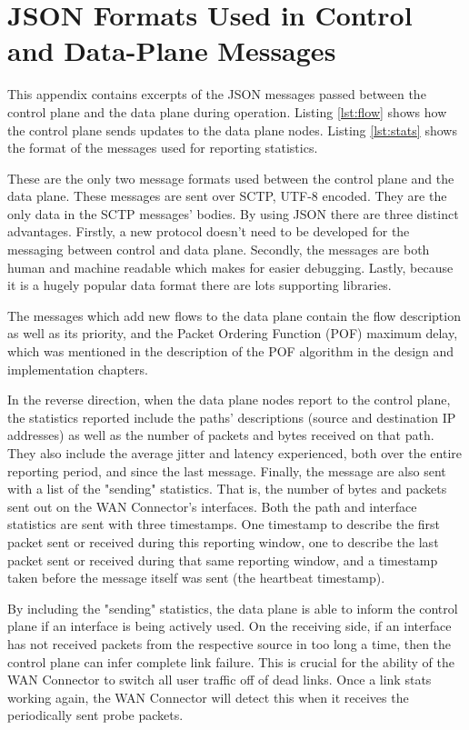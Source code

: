 

\cleardoublepage
\chapter{JSON Formats Used in Control and Data-Plane Messages}
\label{appendix:format}

This appendix contains excerpts of the JSON messages passed between the control plane and the data plane during operation. Listing \ref{lst:flow} shows how the control plane sends updates to the data plane nodes. Listing \ref{lst:stats} shows the format of the messages used for reporting statistics.

These are the only two message formats used between the control plane and the data plane. These messages are sent over SCTP, UTF-8 encoded. They are the only data in the SCTP messages' bodies. By using JSON there are three distinct advantages. Firstly, a new protocol doesn't need to be developed for the messaging between control and data plane. Secondly, the messages are both human and machine readable which makes for easier debugging. Lastly, because it is a hugely popular data format there are lots supporting libraries. 

The messages which add new flows to the data plane contain the flow description as well as its priority, and the Packet Ordering Function (POF) maximum delay, which was mentioned in the description of the POF algorithm in the design and implementation chapters.

In the reverse direction, when the data plane nodes report to the control plane, the statistics reported include the paths' descriptions (source and destination IP addresses) as well as the number of packets and bytes received on that path. They also include the average jitter and latency experienced, both over the entire reporting period, and since the last message. Finally, the message are also sent with a list of the "sending" statistics. That is, the number of bytes and packets sent out on the WAN Connector's interfaces. Both the path and interface statistics are sent with three timestamps. One timestamp to describe the first packet sent or received during this reporting window, one to describe the last packet sent or received during that same reporting window, and a timestamp taken before the message itself was sent (the heartbeat timestamp).

By including the "sending" statistics, the data plane is able to inform the control plane if an interface is being actively used. On the receiving side, if an interface has not received packets from the respective source in too long a time, then the control plane can infer complete link failure. This is crucial for the ability of the WAN Connector to switch all user traffic off of dead links. Once a link stats working again, the WAN Connector will detect this when it receives the periodically sent probe packets.

